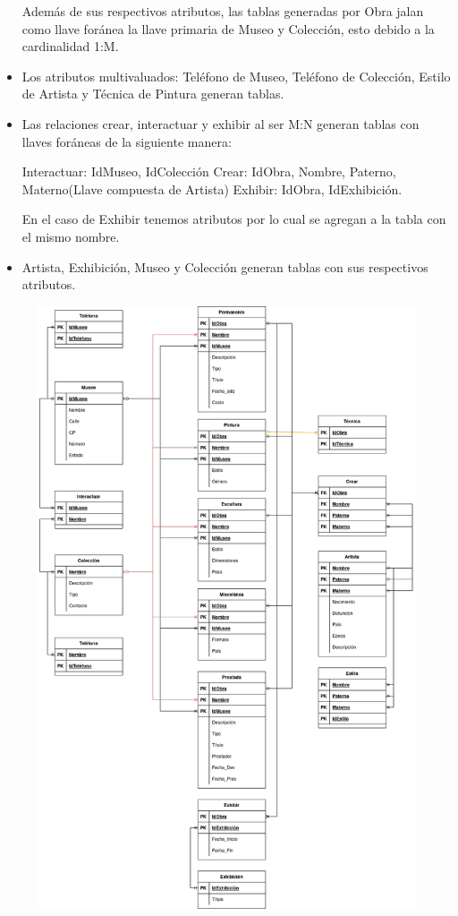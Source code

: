 \documentclass{exam}
\begin{document}
\begin{questions}
\begin{itemize}
	Además de sus respectivos atributos, las tablas generadas por Obra jalan como llave foránea la llave primaria de Museo y Colección, esto debido a la cardinalidad 1:M.
	
	\item Los atributos multivaluados: Teléfono de Museo, Teléfono de Colección, Estilo de Artista y Técnica de Pintura generan tablas.
	
	\item Las relaciones crear, interactuar y exhibir al ser M:N generan tablas con llaves foráneas de la siguiente manera:
	
	Interactuar: IdMuseo, IdColección
	Crear: IdObra, Nombre, Paterno, Materno(Llave compuesta de Artista)
	Exhibir: IdObra, IdExhibición.
	
	En el caso de Exhibir tenemos atributos por lo cual se agregan a la tabla con el mismo nombre.
	
	\item Artista, Exhibición, Museo y Colección generan tablas con sus respectivos atributos.
	
	\end{itemize}
	
	
	\begin{figure}[h!]
        \centering
        \includegraphics[width=14cm]{../Diagramas/2.png}
    \end{figure}
	

\end{questions}
\end{document}
